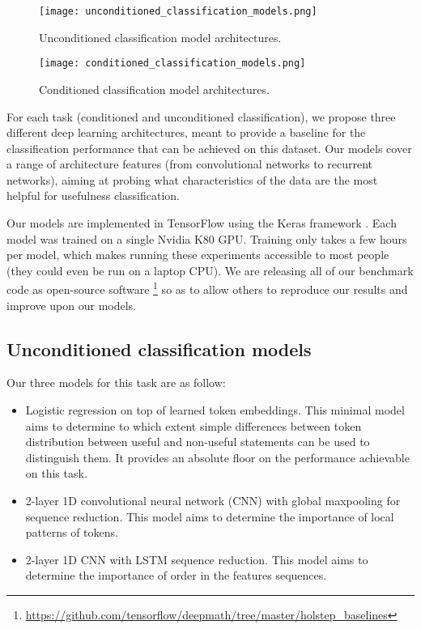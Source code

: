 \documentclass[]{article}
\begin{document}
\begin{figure}[!ht]
  \caption{Unconditioned classification model architectures.}
  \label{uncond_models}
  \centering
    \texttt{[image: unconditioned\_classification\_models.png]}
\end{figure}

\begin{figure}[!ht]
  \caption{Conditioned classification model architectures.}
  \label{cond_models}
  \centering
    \texttt{[image: conditioned\_classification\_models.png]}
\end{figure}


For each task (conditioned and unconditioned classification), we propose
three different deep learning architectures, meant to provide a baseline
for the classification performance that can be achieved on this dataset.
Our models cover a range of architecture features (from convolutional
networks to recurrent networks), aiming at probing what characteristics
of the data are the most helpful for usefulness classification.

Our models are implemented in TensorFlow \citep{tensorflow} using the
Keras framework \citep{keras}. Each model was trained on a single Nvidia
K80 GPU. Training only takes a few hours per model, which makes running
these experiments accessible to most people (they could even be run on a
laptop CPU). We are releasing all of our benchmark code as open-source
software
\footnote{\url{https://github.com/tensorflow/deepmath/tree/master/holstep_baselines}}
 so as to allow others to reproduce our results and improve upon
our models.


\subsection{Unconditioned classification models}

Our three models for this task are as follow:

\begin{itemize}
\item
  Logistic regression on top of learned token embeddings. This minimal
  model aims to determine to which extent simple differences between
  token distribution between useful and non-useful statements can be
  used to distinguish them. It provides an absolute floor on the
  performance achievable on this task.
\item
  2-layer 1D convolutional neural network (CNN) with global maxpooling
  for sequence reduction. This model aims to determine the importance of
  local patterns of tokens.
\item
  2-layer 1D CNN with LSTM \citep{lstm} sequence reduction. This model
  aims to determine the importance of order in the features sequences.
\end{itemize}
\end{document}
